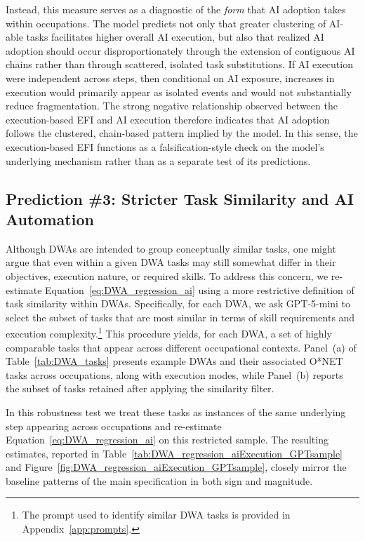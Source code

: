 Instead, this measure serves as a diagnostic of the \emph{form} that AI adoption takes within occupations.
The model predicts not only that greater clustering of AI-able tasks facilitates higher overall AI execution, but also that realized AI adoption should occur disproportionately through the extension of contiguous AI chains rather than through scattered, isolated task substitutions.
If AI execution were independent across steps, then conditional on AI exposure, increases in execution would primarily appear as isolated events and would not substantially reduce fragmentation.
The strong negative relationship observed between the execution-based EFI and AI execution therefore indicates that AI adoption follows the clustered, chain-based pattern implied by the model.
In this sense, the execution-based EFI functions as a falsification-style check on the model's underlying mechanism rather than as a separate test of its predictions.



\subsection{Prediction \#3: Stricter Task Similarity and AI Automation}
\label{app:additional_robustness_pred3}

Although DWAs are intended to group conceptually similar tasks, one might argue that even within a given DWA tasks may still somewhat differ in their objectives, execution nature, or required skills.
To address this concern, we re-estimate Equation~\eqref{eq:DWA_regression_ai} using a more restrictive definition of task similarity within DWAs.
Specifically, for each DWA, we ask GPT-5-mini to select the subset of tasks that are most similar in terms of skill requirements and execution complexity.\footnote{The prompt used to identify similar DWA tasks is provided in Appendix~\ref{app:prompts}.}
This procedure yields, for each DWA, a set of highly comparable tasks that appear across different occupational contexts.
Panel~(a) of Table~\ref{tab:DWA_tasks} presents example DWAs and their associated O*NET tasks across occupations, along with execution modes, while Panel~(b) reports the subset of tasks retained after applying the similarity filter.

In this robustness test we treat these tasks as instances of the same underlying step appearing across occupations and re-estimate Equation~\eqref{eq:DWA_regression_ai} on this restricted sample.
The resulting estimates, reported in Table~\ref{tab:DWA_regression_aiExecution_GPTsample} and Figure~\ref{fig:DWA_regression_aiExecution_GPTsample}, closely mirror the baseline patterns of the main specification in both sign and magnitude.

